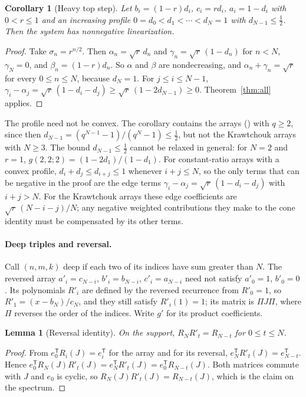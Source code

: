 \documentclass[twoside,10pt]{article}
\numberwithin{equation}{section}
\theoremstyle{slbody}
\newtheorem{lemma}[theorem]{Lemma}
\newtheorem{corollary}[theorem]{Corollary}
\theoremstyle{definition}
\theoremstyle{remark}
\renewcommand{\eqref}[1]{\textup{{\normalfont(\oldstylenums{\ref{#1}}}\normalfont)}}
\begin{document}
\begin{corollary}[Heavy top step]\label{cor:heavy}
Let $b_i=(1-r)d_i$, $c_i=rd_i$, $a_i=1-d_i$ with $0<r\leq1$ and an increasing profile $0=d_0<d_1<\cdots<d_N=1$ with $d_{N-1}\leq\tfrac12$. Then the system has nonnegative linearization.
\end{corollary}
\begin{proof}
Take $\sigma_n=r^{n/2}$. Then $\alpha_n=\sqrt r\,d_n$ and $\gamma_n=\sqrt r\,(1-d_n)$ for $n<N$, $\gamma_N=0$, and $\beta_n=(1-r)d_n$. So $\alpha$ and $\beta$ are nondecreasing, and $\alpha_n+\gamma_n=\sqrt r$ for every $0\leq n\leq N$, because $d_N=1$. For $j\leq i\leq N-1$, $\gamma_i-\alpha_j=\sqrt r\,(1-d_i-d_j)\geq\sqrt r\,(1-2d_{N-1})\geq0$. Theorem~\ref{thm:all} applies.
\end{proof}

The profile need not be convex. The corollary contains the arrays \eqref{eq:parameters} with $q\geq2$, since then $d_{N-1}=(q^{N-1}-1)/(q^N-1)\leq\tfrac12$, but not the Krawtchouk arrays with $N\geq3$. The bound $d_{N-1}\leq\tfrac12$ cannot be relaxed in general: for $N=2$ and $r=1$, $g(2,2;2)=(1-2d_1)/(1-d_1)$. For constant-ratio arrays with a convex profile, $d_i+d_j\leq d_{i+j}\leq1$ whenever $i+j\leq N$, so the only terms that can be negative in the proof are the edge terms $\gamma_i-\alpha_j=\sqrt r\,(1-d_i-d_j)$ with $i+j>N$. For the Krawtchouk arrays these edge coefficients are $\sqrt r\,(N-i-j)/N$; any negative weighted contributions they make to the cone identity must be compensated by its other terms.

\paragraph{Deep triples and reversal.}
Call $(n,m,k)$ deep if each two of its indices have sum greater than $N$. The reversed array $a'_i=c_{N-i}$, $b'_i=b_{N-i}$, $c'_i=a_{N-i}$ need not satisfy $a'_0=1$, $b'_0=0$. Its polynomials $R'_i$ are defined by the reversed recurrence from $R'_0=1$, so $R'_1=(x-b_N)/c_N$, and they still satisfy $R'_i(1)=1$; its matrix is $\Pi J\Pi$, where $\Pi$ reverses the order of the indices. Write $g'$ for its product coefficients.

\begin{lemma}[Reversal identity]\label{lem:reversal}
On the support, $R_NR'_t=R_{N-t}$ for $0\leq t\leq N$.
\end{lemma}
\begin{proof}
From $e_0^{\mathsf T}R_i(J)=e_i^{\mathsf T}$ for the array and for its reversal, $e_N^{\mathsf T}R'_t(J)=e_{N-t}^{\mathsf T}$. Hence $e_0^{\mathsf T}R_N(J)R'_t(J)=e_N^{\mathsf T}R'_t(J)=e_0^{\mathsf T}R_{N-t}(J)$. Both matrices commute with $J$ and $e_0$ is cyclic, so $R_N(J)R'_t(J)=R_{N-t}(J)$, which is the claim on the spectrum.
\end{proof}
\end{document}
